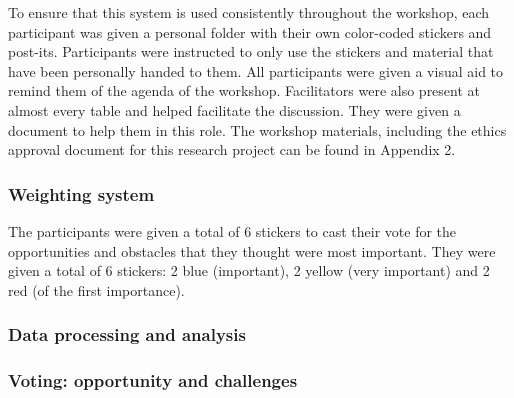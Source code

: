To ensure that this system is used consistently throughout the workshop, each participant was given a personal folder with their own color-coded stickers and post-its. Participants were instructed to only use the stickers and material that have been personally handed to them. All participants were given a visual aid to remind them of the agenda of the workshop. Facilitators were also present at almost every table and helped facilitate the discussion. They were given a document to help them in this role. The workshop materials, including the ethics approval document for this research project can be found in Appendix 2.\\

\subsubsection*{Weighting system}

The participants were given a total of 6 stickers to cast their vote for the opportunities and obstacles that they thought were most important. They were given a total of 6 stickers: 2 blue (important), 2 yellow (very important) and 2 red (of the first importance).\\

\subsubsection{Data processing and analysis}

\subsubsection*{Voting: opportunity and challenges}

